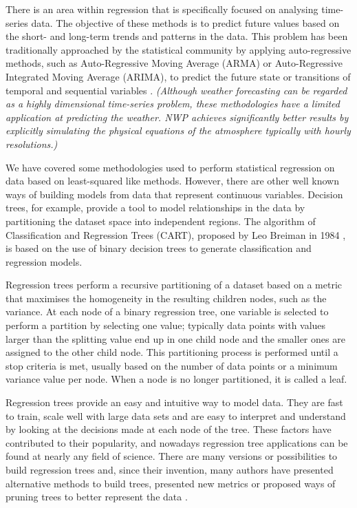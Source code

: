 \bigskip
\bigskip

There is an area within regression that is specifically focused on analysing time-series data. The objective of these methods is to predict future values based on the short- and long-term trends and patterns in the data. This problem has been traditionally approached by the statistical community by applying auto-regressive methods, such as Auto-Regressive Moving Average (ARMA) or Auto-Regressive Integrated Moving Average (ARIMA), to predict the future state or transitions of temporal and sequential variables \citep{stram1986temporal,zhang2003time}. \textit{(Although weather forecasting can be regarded as a highly dimensional time-series problem, these methodologies have a limited application at predicting the weather. NWP achieves significantly better results by explicitly simulating the physical equations of the atmosphere typically with hourly resolutions.)}

\medskip

We have covered some methodologies used to perform statistical regression on data based on least-squared like methods. However, there are other well known ways of building models from data that represent continuous variables. Decision trees, for example, provide a tool to model relationships in the data by partitioning the dataset space into independent regions. The algorithm of Classification and Regression Trees (CART), proposed by Leo Breiman in 1984 \citep{breiman1984classification}, is based on the use of binary decision trees to generate classification and regression models. 

\medskip

Regression trees perform a recursive partitioning of a dataset based on a metric that maximises the homogeneity in the resulting children nodes, such as the variance. At each node of a binary regression tree, one variable is selected to perform a partition by selecting one value; typically data points with values larger than the splitting value end up in one child node and the smaller ones are assigned to the other child node. This partitioning process is performed until a stop criteria is met, usually based on the number of data points or a minimum variance value per node. When a node is no longer partitioned, it is called a leaf.

\medskip

Regression trees provide an easy and intuitive way to model data. They are fast to train, scale well with large data sets and are easy to interpret and understand by looking at the decisions made at each node of the tree. These factors have contributed to their popularity, and nowadays regression tree applications can be found at nearly any field of science. There are many versions or possibilities to build regression trees and, since their invention, many authors have presented alternative methods to build trees, presented new metrics or proposed ways of pruning trees to better represent the data \citep{quinlan2014c4,freund1999alternating}. 

